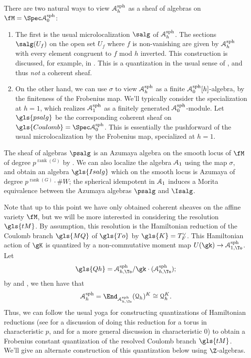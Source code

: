 There are two natural ways to view $\EuScript{A}_h^{\operatorname{sph}}$ as a sheaf of algebras on $\fM=\Spec \EuScript{A}_0^{\operatorname{sph}}$:
\begin{enumerate}
\item The first is the usual microlocalization $\salg$ of
  $\EuScript{A}_h^{\operatorname{sph}}$. The sections $\salg(U_f)$ on the
  open set $U_f$ where $f$ is non-vanishing are given by
  $\EuScript{A}_h^{\operatorname{sph}}$ with every element congruent
  to $f$ mod $h$ inverted.  This construction is discussed, for example, in \cite[\S 4.1]{BLPWquant}.  This is a quantization in the usual sense
  of \cite{BKpos}, and thus {\it not} a coherent sheaf.

\item On the other hand, we can use $\sigma$ to view  $\EuScript{A}_h^{\operatorname{sph}}$ as a finite $\EuScript{A}_0^{\operatorname{sph}}[h]$-algebra, by the finiteness of the Frobenius map.  We'll typically consider the specialization at
$h=1$, which realizes $\EuScript{A}_1^{\operatorname{sph}}$ as a finitely generated $\EuScript{A}_0^{\operatorname{sph}}$-module.  Let $\gls{psalg}$ be the corresponding coherent sheaf on $\gls{Coulomb}=\Spec \EuScript{A}_0^{\operatorname{sph}}$.  This is essentially the 
pushforward of the usual microlocalization by the
Frobenius map, specialized at $h=1$.
\end{enumerate}


The sheaf of algebras $\psalg$ is an Azumaya
algebra on the smooth locus of $\fM$  of degree $p^{\operatorname{rank}(G)}$ by \cite[Lemma 3.2]{BKpos}.  We can also localize the algebra $\EuScript{A}_1$ using the map $\sigma$, and obtain an algebra $\gls{Isalg}$ which on the smooth locus is Azumaya of degree $p^{\operatorname{rank}(G)}\cdot \#W$; the spherical idempotent in $\EuScript{A}_1$ induces a Morita equivalence between the Azumaya algebras $\psalg$ and $\Isalg$.

Note that up to this point we have only obtained coherent sheaves on the affine variety $\fM$, but we will be more interested in considering the resolution $\gls{tM}$.  By assumption, this resolution is the Hamiltonian reduction of the  Coulomb branch $\gls{MQ}$ of $\gls{To}$ by $\gls{K}=T_F^\vee$.  This Hamiltonian action of $\gK$ is quantized by a non-commutative moment map $U(\gk)\to \EuScript{A}_{1,\To}^{\operatorname{sph}}$.  Let \[\gls{Qh}=\EuScript{A}_{h,\To}^{\operatorname{sph}}/\gk \cdot (\EuScript{A}_{h,\To}^{\operatorname{sph}});\] by \cite[3(vii)(d)]{BFN} and \cite[Lem. 3.15]{WebSD}, we then have that
\begin{equation}
\EuScript{A}_{h}^{\operatorname{sph}}=\End_{\EuScript{A}_{h,\To}^{\operatorname{sph}} }(\EuScript{Q}_h)^K\cong \EuScript{Q}_h^K.\label{eq:qham}
\end{equation}
Thus, we can follow the usual yoga for constructing quantizations of Hamiltonian reductions (see \cite[4.3]{Stadnik} for a discussion of doing this reduction for a torus in characteristic $p$, and \cite[\S 2.5]{KR07} for a more general discussion in characteristic $0$)  to obtain a Frobenius constant quantization of the
resolved Coulomb branch $\gls{tM}$.  We'll give an alternate construction of this quantization below using $\Z$-algebras.

